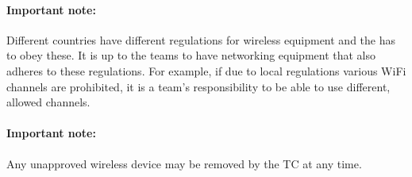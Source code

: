 \paragraph*{Important note:} Different countries have different regulations for wireless equipment and the  has to obey these. 
It is up to the teams to have networking equipment that also adheres to these regulations. For example, if due to local regulations various WiFi channels are prohibited, it is a team's responsibility to be able to use different, allowed channels.

\paragraph*{Important note:} Any unapproved wireless device may be removed by the TC at any time.

